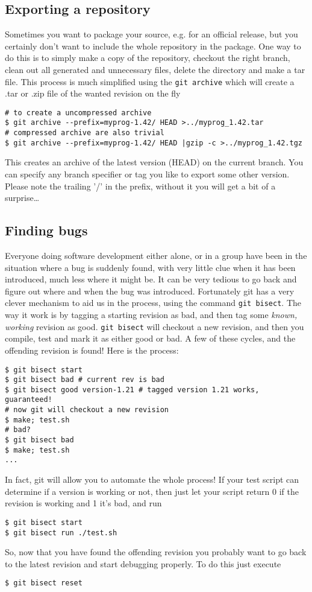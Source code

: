 \documentclass[a4paper,10pt]{article}
\begin{document}
\subsection{Exporting a repository}
Sometimes you want to package your source, e.g. for an official release, but
you certainly don't want to include the whole repository in the package. One
way to do this is to simply make a copy of the repository, checkout the right
branch, clean out all
generated and unnecessary files, delete the  directory and make a tar
file. This process is much simplified using the \texttt{git archive} which
will create a .tar or .zip file of the wanted revision on the fly
\begin{verbatim}
# to create a uncompressed archive
$ git archive --prefix=myprog-1.42/ HEAD >../myprog_1.42.tar
# compressed archive are also trivial
$ git archive --prefix=myprog-1.42/ HEAD |gzip -c >../myprog_1.42.tgz
\end{verbatim}
This creates an archive of the latest version (HEAD) on the current branch.
You can specify any branch specifier or tag you like to export some other
version.
Please note the trailing '/' in the prefix, without it you will get a bit of a
surprise\ldots

\subsection{Finding bugs}
\label{sec:bisect}
Everyone doing software development either alone, or in a group have been in
the situation where a bug is suddenly found, with very little clue when
it has been introduced, much less where it might be. It can be very tedious to
go back and figure out where and when the bug was introduced. Fortunately git
has a very clever mechanism to aid us in the process, using the command
\texttt{git bisect}. The way it work is by tagging a starting revision as bad,
and then tag some \textit{known, working} revision as good.  \texttt{git
bisect} will checkout a new revision, and then you compile, test and mark it
as either good or bad. A few of these cycles, and the offending revision is
found! Here is the process:

\begin{verbatim}
$ git bisect start 
$ git bisect bad # current rev is bad
$ git bisect good version-1.21 # tagged version 1.21 works, guaranteed!
# now git will checkout a new revision 
$ make; test.sh 
# bad?
$ git bisect bad
$ make; test.sh
...
\end{verbatim}
In fact, git will allow you to automate the whole process! If your test script
can determine if a version is working or not, then just let your script return
0 if the revision is working and 1 it's bad, and run
\begin{verbatim}
$ git bisect start 
$ git bisect run ./test.sh
\end{verbatim}
So, now that you have found the offending revision you probably want to go 
back to the latest revision and start debugging properly. To do this just
execute
\begin{verbatim}
$ git bisect reset
\end{verbatim}
\end{document}
